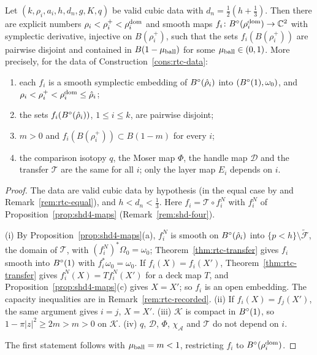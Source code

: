\begin{theorem}\label{thm:cub-packing}\label{prop:rtc-embeddings}
Let $(k,\rho_i,a_i,h,d_n,g,K,q)$ be valid cubic data with $d_n=\frac12(h+\frac13)$. Then there are explicit numbers
$\rho_i<\rho_i^+<\rho_i^{\rm dom}$ and smooth maps $f_i\colon B^{\circ}(\rho_i^{\rm dom})\to\mathbb{C}^2$ with symplectic derivative, injective
on $B(\rho_i^+)$, such that the sets $f_i(B(\rho_i^+))$ are pairwise disjoint and contained in $B(1-\mu_{\rm ball})$ for some
$\mu_{\rm ball}\in(0,1)$. More precisely, for the data of Construction~\ref{cons:rtc-data}:
\begin{enumerate}[label=(\roman*)]
\item each $f_i$ is a smooth symplectic embedding of $B^{\circ}(\hat\rho_i)$ into $(B^{\circ}(1),\omega_0)$, and
$\rho_i<\rho_i^+<\rho_i^{\rm dom}\le\hat\rho_i$;
\item the sets $f_i(B^{\circ}(\hat\rho_i))$, $1\le i\le k$, are pairwise disjoint;
\item $m>0$ and $f_i(B(\rho_i^+))\subset B(1-m)$ for every $i$;
\item the comparison isotopy $q$, the Moser map $\Phi$, the handle map $\mathcal D$ and the transfer $\mathcal T$ are the same for all $i$;
only the layer map $E_i$ depends on $i$.
\end{enumerate}
\end{theorem}

\begin{proof}
The data are valid cubic data by hypothesis (in the equal case by  and Remark~\ref{rem:rtc-equal}), and $h<d_n<\frac13$. Here $f_i=\mathcal T\circ f^N_i$ with $f^N_i$ of Proposition~\ref{prop:shd4-maps} (Remark~\ref{rem:shd-four}).

(i) By Proposition~\ref{prop:shd4-maps}(a), $f^N_i$ is smooth on $B^{\circ}(\hat\rho_i)$ into $\{p<h\}\setminus\widetilde{\mathcal F}$, the domain of $\mathcal T$, with $(f^N_i)^*\Omega_0=\omega_0$; Theorem~\ref{thm:rtc-transfer} gives $f_i$ smooth into $B^{\circ}(1)$ with $f_i^*\omega_0=\omega_0$. If $f_i(X)=f_i(X')$, Theorem~\ref{thm:rtc-transfer} gives $f^N_i(X)=Tf^N_i(X')$ for a deck map $T$, and Proposition~\ref{prop:shd4-maps}(c) gives $X=X'$; so $f_i$ is an open embedding. The capacity inequalities are in Remark~\ref{rem:rtc-recorded}.
(ii) If $f_i(X)=f_j(X')$, the same argument gives $i=j$, $X=X'$.
(iii) $\mathcal K$ is compact in $B^{\circ}(1)$, so $1-\pi|z|^2\ge2m>m>0$ on $\mathcal K$.
(iv) $q$, $\mathcal D$, $\Phi$, $\chi_{\mathcal A}$ and $\mathcal T$ do not depend on $i$.

The first statement follows with $\mu_{\rm ball}=m<1$, restricting $f_i$ to $B^{\circ}(\rho_i^{\rm dom})$.
\end{proof}

